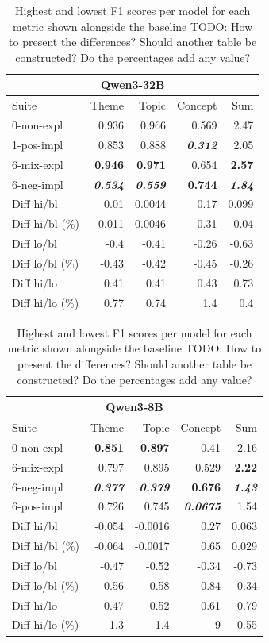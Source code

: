 \begin{table}
    \begin{tabular}{lrrrr}
    \toprule
    \multicolumn{5}{c}{\textbf{Qwen3-32B}} \\
    \midrule
    Suite & Theme & Topic & Concept & Sum \\
    \midrule
    0-non-expl & 0.936 & 0.966 & 0.569 & 2.47 \\
    1-pos-impl & 0.853 & 0.888 & \bfseries \itshape 0.312 & 2.05 \\
    6-mix-expl & \bfseries 0.946 & \bfseries 0.971 & 0.654 & \bfseries 2.57 \\
    6-neg-impl & \bfseries \itshape 0.534 & \bfseries \itshape 0.559 & \bfseries 0.744 & \bfseries \itshape 1.84 \\
    \midrule
Diff hi/bl & 0.01 & 0.0044 & 0.17 & 0.099 \\
Diff hi/bl (\%) & 0.011 & 0.0046 & 0.31 & 0.04 \\
Diff lo/bl & -0.4 & -0.41 & -0.26 & -0.63 \\
Diff lo/bl (\%) & -0.43 & -0.42 & -0.45 & -0.26 \\
Diff hi/lo & 0.41 & 0.41 & 0.43 & 0.73 \\
Diff hi/lo (\%) & 0.77 & 0.74 & 1.4 & 0.4 \\
    \bottomrule
    \end{tabular}
    \begin{tabular}{lrrrr}
    \toprule
    \multicolumn{5}{c}{\textbf{Qwen3-8B}} \\
    \midrule
    Suite & Theme & Topic & Concept & Sum \\
    \midrule
    0-non-expl & \bfseries 0.851 & \bfseries 0.897 & 0.41 & 2.16 \\
    6-mix-expl & 0.797 & 0.895 & 0.529 & \bfseries 2.22 \\
    6-neg-impl & \bfseries \itshape 0.377 & \bfseries \itshape 0.379 & \bfseries 0.676 & \bfseries \itshape 1.43 \\
    6-pos-impl & 0.726 & 0.745 & \bfseries \itshape 0.0675 & 1.54 \\
    \midrule
Diff hi/bl & -0.054 & -0.0016 & 0.27 & 0.063 \\
Diff hi/bl (\%) & -0.064 & -0.0017 & 0.65 & 0.029 \\
Diff lo/bl & -0.47 & -0.52 & -0.34 & -0.73 \\
Diff lo/bl (\%) & -0.56 & -0.58 & -0.84 & -0.34 \\
Diff hi/lo & 0.47 & 0.52 & 0.61 & 0.79 \\
Diff hi/lo (\%) & 1.3 & 1.4 & 9 & 0.55 \\
    \bottomrule
    \end{tabular}
    \caption{Highest and lowest F1 scores per model for each metric shown alongside the baseline TODO: How to present the differences? Should another table be constructed? Do the percentages add any value?}
    \label{tab:baselines_compared}
\end{table}